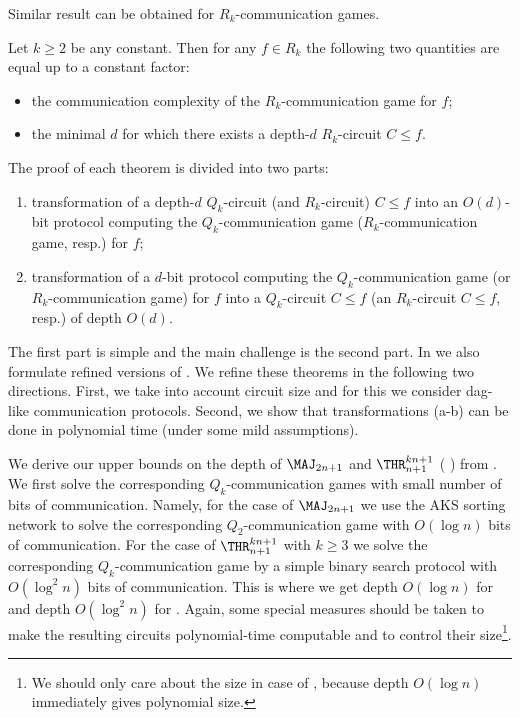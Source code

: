  Similar result can be obtained for $R_k$-communication games.

\begin{theorem}
\label{R_k_main}
Let $k \ge 2$ be any constant. Then for any $f\in R_k$ the following two quantities are equal up to a constant factor:
\begin{itemize}
\item the communication complexity of the $R_k$-communication game for $f$;
\item the minimal $d$ for which there exists a
%
depth-$d$   %
$R_k$-circuit $C \le f$.
\end{itemize}
\end{theorem}

%
The proof of each theorem is divided into two parts: %
\begin{enumerate}[label=(\alph*)]
\item  transformation of a depth-$d$ $Q_k$-circuit 
%
(and $R_k$-circuit)  %
$C \le f$ into an $O(d)$-bit protocol computing the $Q_k$-communication 
%
game ($R_k$-communication game, resp.) for $f$;  %
\item  transformation of a $d$-bit protocol computing the
$Q_k$-communication game (or $R_k$-communication game)
for $f$ into %
a $Q_k$-circuit $C\le f$
(an $R_k$-circuit $C\le f$, resp.) %
of depth $O(d)$.  %
\end{enumerate}

The first part is simple and the main challenge is the second part. In  %
%
%
we also formulate refined versions of  . %
We  %
refine these theorems in the following two directions.
%
First,  %
we take into account circuit size and for this we consider dag-like communication protocols.  %
Second,  %
we show that transformations (a-b) can be done in polynomial time (under some mild assumptions). 

 We derive our  upper bounds on the depth of $\MAJ_{2n + 1}$ and $\THR^{kn + 1}_{n + 1}$ ( ) from . We first solve the corresponding $Q_k$-communication games with small number of bits of communication. Namely, for the case of $\MAJ_{2n + 1}$ we use the AKS sorting network to solve the corresponding $Q_2$-communication game with $O(\log n)$ bits of communication. For the case of $\THR^{kn + 1}_{n + 1}$ with $k\ge 3$ we solve the corresponding $Q_k$-communication game by a simple binary search protocol with $O(\log^2 n)$ bits of communication. This is where we get depth $O(\log n)$ for  and depth $O(\log^2 n)$ for . Again, some special measures should be taken to make the resulting circuits polynomial-time computable and to control their size\footnote{We should only care about the size in case of , because depth $O(\log n)$ immediately gives polynomial size.}.


